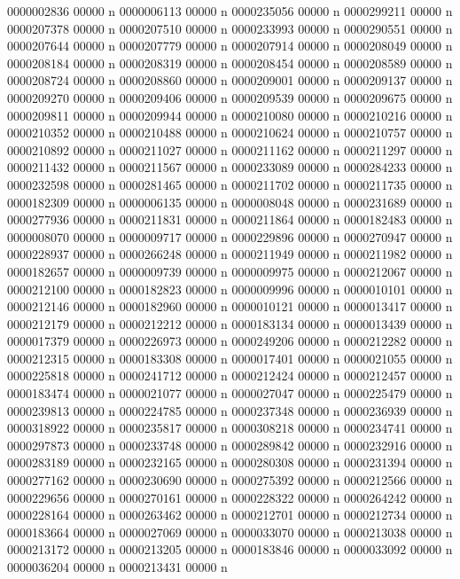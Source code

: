 {{{{{{{0000002836 00000 n 
0000006113 00000 n 
0000235056 00000 n 
0000299211 00000 n 
0000207378 00000 n 
0000207510 00000 n 
0000233993 00000 n 
0000290551 00000 n 
0000207644 00000 n 
0000207779 00000 n 
0000207914 00000 n 
0000208049 00000 n 
0000208184 00000 n 
0000208319 00000 n 
0000208454 00000 n 
0000208589 00000 n 
0000208724 00000 n 
0000208860 00000 n 
0000209001 00000 n 
0000209137 00000 n 
0000209270 00000 n 
0000209406 00000 n 
0000209539 00000 n 
0000209675 00000 n 
0000209811 00000 n 
0000209944 00000 n 
0000210080 00000 n 
0000210216 00000 n 
0000210352 00000 n 
0000210488 00000 n 
0000210624 00000 n 
0000210757 00000 n 
0000210892 00000 n 
0000211027 00000 n 
0000211162 00000 n 
0000211297 00000 n 
0000211432 00000 n 
0000211567 00000 n 
0000233089 00000 n 
0000284233 00000 n 
0000232598 00000 n 
0000281465 00000 n 
0000211702 00000 n 
0000211735 00000 n 
0000182309 00000 n 
0000006135 00000 n 
0000008048 00000 n 
0000231689 00000 n 
0000277936 00000 n 
0000211831 00000 n 
0000211864 00000 n 
0000182483 00000 n 
0000008070 00000 n 
0000009717 00000 n 
0000229896 00000 n 
0000270947 00000 n 
0000228937 00000 n 
0000266248 00000 n 
0000211949 00000 n 
0000211982 00000 n 
0000182657 00000 n 
0000009739 00000 n 
0000009975 00000 n 
0000212067 00000 n 
0000212100 00000 n 
0000182823 00000 n 
0000009996 00000 n 
0000010101 00000 n 
0000212146 00000 n 
0000182960 00000 n 
0000010121 00000 n 
0000013417 00000 n 
0000212179 00000 n 
0000212212 00000 n 
0000183134 00000 n 
0000013439 00000 n 
0000017379 00000 n 
0000226973 00000 n 
0000249206 00000 n 
0000212282 00000 n 
0000212315 00000 n 
0000183308 00000 n 
0000017401 00000 n 
0000021055 00000 n 
0000225818 00000 n 
0000241712 00000 n 
0000212424 00000 n 
0000212457 00000 n 
0000183474 00000 n 
0000021077 00000 n 
0000027047 00000 n 
0000225479 00000 n 
0000239813 00000 n 
0000224785 00000 n 
0000237348 00000 n 
0000236939 00000 n 
0000318922 00000 n 
0000235817 00000 n 
0000308218 00000 n 
0000234741 00000 n 
0000297873 00000 n 
0000233748 00000 n 
0000289842 00000 n 
0000232916 00000 n 
0000283189 00000 n 
0000232165 00000 n 
0000280308 00000 n 
0000231394 00000 n 
0000277162 00000 n 
0000230690 00000 n 
0000275392 00000 n 
0000212566 00000 n 
0000229656 00000 n 
0000270161 00000 n 
0000228322 00000 n 
0000264242 00000 n 
0000228164 00000 n 
0000263462 00000 n 
0000212701 00000 n 
0000212734 00000 n 
0000183664 00000 n 
0000027069 00000 n 
0000033070 00000 n 
0000213038 00000 n 
0000213172 00000 n 
0000213205 00000 n 
0000183846 00000 n 
0000033092 00000 n 
0000036204 00000 n 
0000213431 00000 n 
}}}}}}}
